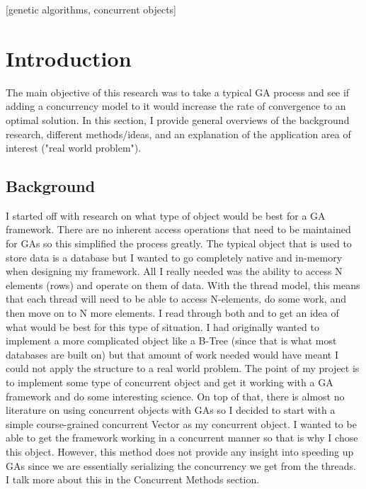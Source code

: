 \documentclass{acm_proc_article-sp}
\begin{document}
%
%
[genetic algorithms, concurrent objects]


%
%
\section{Introduction}

The main objective of this research was to take a typical GA process and see if adding a concurrency model to it would increase the rate of convergence to an optimal solution. In this section, I provide general overviews of the background research, different methods/ideas, and an explanation of the application area of interest ("real world problem").

\subsection{Background}

I started off with research on what type of object would be best for a GA framework. There are no inherent access operations that need to be maintained for GAs so this simplified the process greatly. The typical object that is used to store data is a database but I wanted to go completely native and in-memory when designing my framework. All I really needed was the ability to access N elements (rows) and operate on them of data. With the thread model, this means that each thread will need to be able to access N-elements, do some work, and then move on to N more elements. I read through both \cite{herlihy:artmulti} and \cite{williams:cppconcurrent} to get an idea of what would be best for this type of situation. I had originally wanted to implement a more complicated object like a B-Tree (since that is what most databases are built on) but that amount of work needed would have meant I could not apply the structure to a real world problem. The point of my project is to implement some type of concurrent object and get it working with a GA framework and do some interesting science. On top of that, there is almost no literature on using concurrent objects with GAs so I decided to start with a simple course-grained concurrent Vector as my concurrent object. I wanted to be able to get the framework working in a concurrent manner so that is why I chose this object. However, this method does not provide any insight into speeding up GAs since we are essentially serializing the concurrency we get from the threads. I talk more about this in the Concurrent Methods section.
\end{document}
